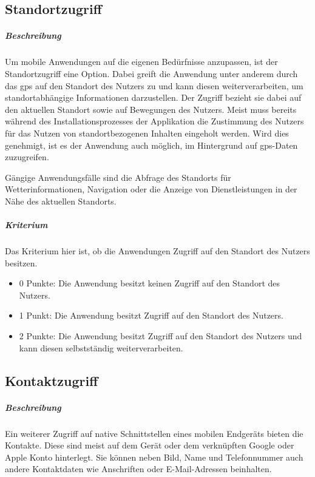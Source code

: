 \subsection{Standortzugriff}
\subparagraph{Beschreibung\\}
Um mobile Anwendungen auf die eigenen Bedürfnisse anzupassen, ist der Standortzugriff eine Option.
Dabei greift die Anwendung unter anderem durch das \ac{gps} auf den Standort des Nutzers zu und kann diesen weiterverarbeiten, um standortabhängige Informationen darzustellen.
Der Zugriff bezieht sie dabei auf den aktuellen Standort sowie auf Bewegungen des Nutzers.
Meist muss bereits während des Installationsprozesses der Applikation die Zustimmung des Nutzers für das Nutzen von standortbezogenen Inhalten eingeholt werden.
Wird dies genehmigt, ist es der Anwendung auch möglich, im Hintergrund auf \ac{gps}-Daten zuzugreifen.

Gängige Anwendungsfälle sind die Abfrage des Standorts für Wetterinformationen, Navigation oder die Anzeige von Dienstleistungen in der Nähe des aktuellen Standorts.

\subparagraph{Kriterium\\}
Das Kriterium hier ist, ob die Anwendungen Zugriff auf den Standort des Nutzers besitzen.

\begin{itemize}
\item 0 Punkte: Die Anwendung besitzt keinen Zugriff auf den Standort des Nutzers.
\item 1 Punkt: Die Anwendung besitzt Zugriff auf den Standort des Nutzers.
\item 2 Punkte: Die Anwendung besitzt Zugriff auf den Standort des Nutzers und kann diesen selbstständig weiterverarbeiten.
\end{itemize}

\subsection{Kontaktzugriff}
\subparagraph{Beschreibung\\}
Ein weiterer Zugriff auf native Schnittstellen eines mobilen Endgeräts bieten die Kontakte.
Diese sind meist auf dem Gerät oder dem verknüpften Google oder Apple Konto hinterlegt.
Sie können neben Bild, Name und Telefonnummer auch andere Kontaktdaten wie Anschriften oder E-Mail-Adressen beinhalten.

